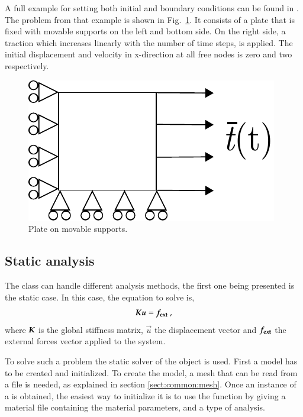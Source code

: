 A full example for setting both  initial and boundary conditions can be found in
.  The problem from that example is
shown in Fig.~\ref{fig:smm:bc_and_ic}. It consists of a plate that is fixed with
movable supports  on the  left and bottom  side. On  the right side,  a traction
which increases linearly with the number  of time steps, is applied. The initial
displacement  and velocity  in x-direction  at all  free nodes  is zero  and two
respectively.
\begin{figure}[!htb]
  \centering
  \includegraphics[scale=0.8]{figures/bc_and_ic_example}
  \caption{Plate on movable supports.\label{fig:smm:bc_and_ic}}
\end{figure}


\subsection{Static analysis\label{sect:smm:static}}

The  class can  handle different analysis methods, the
first one being presented is the static case.  In this case, the equation
to solve is,
\begin{equation}\label{eqn:smm:static}
  \boldsymbol{K} \boldsymbol{u} = \boldsymbol{f_{{\mathrm{ext}}}}~,
\end{equation}
where  $\boldsymbol{K}$ is  the  global stiffness  matrix,  $\vec{u}$ the  displacement
vector  and  $\boldsymbol{f_{{\mathrm{ext}}}}$ the  external  forces  vector  applied to  the
system.


To     solve    such     a    problem     the    static     solver     of    the
  object is used.   First a
model has to be  created and initialized.  To create the model,  a mesh that can
be read from  a file is needed, as  explained in section \ref{sect:common:mesh}.
Once an instance of a  is obtained, the easiest way to
initialize it is  to use the 
function by  giving a  material file containing  the material parameters,  and a
type of analysis.

